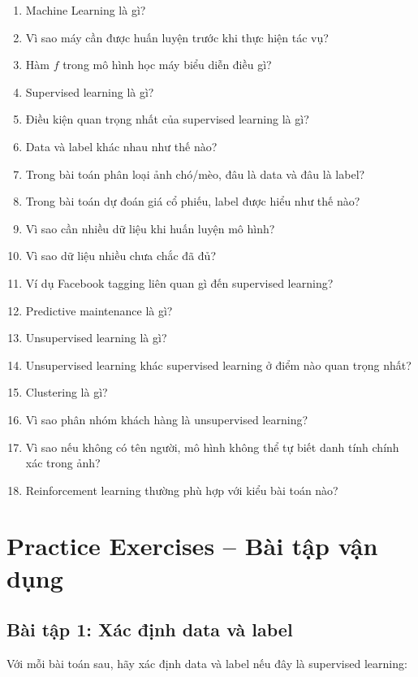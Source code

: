 \begin{enumerate}
    \item Machine Learning là gì?
    \item Vì sao máy cần được huấn luyện trước khi thực hiện tác vụ?
    \item Hàm $f$ trong mô hình học máy biểu diễn điều gì?
    \item Supervised learning là gì?
    \item Điều kiện quan trọng nhất của supervised learning là gì?
    \item Data và label khác nhau như thế nào?
    \item Trong bài toán phân loại ảnh chó/mèo, đâu là data và đâu là label?
    \item Trong bài toán dự đoán giá cổ phiếu, label được hiểu như thế nào?
    \item Vì sao cần nhiều dữ liệu khi huấn luyện mô hình?
    \item Vì sao dữ liệu nhiều chưa chắc đã đủ?
    \item Ví dụ Facebook tagging liên quan gì đến supervised learning?
    \item Predictive maintenance là gì?
    \item Unsupervised learning là gì?
    \item Unsupervised learning khác supervised learning ở điểm nào quan trọng nhất?
    \item Clustering là gì?
    \item Vì sao phân nhóm khách hàng là unsupervised learning?
    \item Vì sao nếu không có tên người, mô hình không thể tự biết danh tính chính xác trong ảnh?
    \item Reinforcement learning thường phù hợp với kiểu bài toán nào?
\end{enumerate}

\section{Practice Exercises -- Bài tập vận dụng}

\subsection*{Bài tập 1: Xác định data và label}

Với mỗi bài toán sau, hãy xác định data và label nếu đây là supervised learning:

